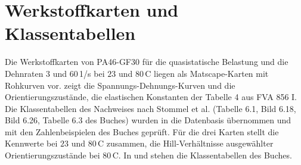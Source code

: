 \section{Werkstoffkarten und Klassentabellen}
\label{sec:anhang_d}

Die Werkstoffkarten von PA46-GF30 für die quasistatische Belastung und die Dehnraten $3$ und $60$\,1/s bei $23$ und $80$\,\textdegree C liegen als Matscape-Karten mit Rohkurven vor.  zeigt die Spannungs-Dehnungs-Kurven und die Orientierungszustände,  die elastischen Konstanten der Tabelle 4 aus FVA 856 I. Die Klassentabellen des Nachweises nach Stommel et al. (Tabelle 6.1, Bild 6.18, Bild 6.26, Tabelle 6.3 des Buches) wurden in die Datenbasis übernommen und mit den Zahlenbeispielen des Buches geprüft. Für die drei Karten stellt  die Kennwerte bei $23$ und $80$\,\textdegree C zusammen,  die Hill-Verhältnisse ausgewählter Orientierungszustände bei $80$\,\textdegree C. In  und  stehen die Klassentabellen des Buches.





